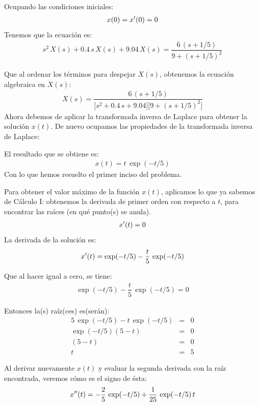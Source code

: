 Ocupando las condiciones iniciales:
\begin{align*}
x(0) = {x}^{\prime}(0) = 0
\end{align*}
Tenemos que la ecuación es:
\begin{align*}
s^{2} \, X(s) + 0.4 \, s \, X(s) + 9.04 \, X(s) = \dfrac{6 \, (s + 1/5)}{9 + (s + 1/5)^{2}}
\end{align*}

Que al ordenar los términos para despejar $X(s)$, obtenemos la ecuación algebraica en $X(s)$:
\begin{align*}
X(s) = \dfrac{6 \, (s + 1/5)}{\big[s^{2} + 0.4 \, s + 9.04\big] \big[9 + (s + 1/5)^{2}\big]}
\end{align*}
Ahora debemos de aplicar la transformada inversa de Laplace para obtener la solución $x(t)$. De nuevo ocupamos las propiedades de la transformada inversa de Laplace:

El resultado que se obtiene es:
\begin{align*}
x(t) = t \, \exp (-t/5)
\end{align*}
Con lo que hemos resuelto el primer inciso del problema.

Para obtener el valor máximo de la función $x(t)$, aplicamos lo que ya sabemos de Cálculo I:  obtenemos la derivada de primer orden con respecto a $t$, para encontrar las raíces (en qué punto(s) se anula).
\begin{align*}
{x}^{\prime}(t) = 0
\end{align*}
La derivada de la solución es:
\begin{align*}
{x}^{\prime}(t) = \exp(-t/5) - \dfrac{t}{5} \, \exp(-t/5) 
\end{align*}

Que al hacer igual a cero, se tiene:
\begin{align*}
\exp(-t/5) - \dfrac{t}{5} \, \exp(-t/5) = 0
\end{align*}

Entonces la(s) raíz(ces) es(serán):
\begin{eqnarray*}
5 \, \exp(-t/5) - t \, \exp(-t/5) &=& 0  \\[0.5em] 
\exp(-t/5) (5 - t) &=& 0 \\[0.5em] 
(5 - t) &=& 0 \\[0.5em] 
t &=& 5
\end{eqnarray*}

Al derivar nuevamente $x(t)$ y evaluar la segunda derivada con la raíz encontrada, veremos cómo es el signo de ésta:
\begin{align*}
{x}^{\prime \prime}(t) = -\dfrac{2}{5} \, \exp(-t/5) + \dfrac{1}{25} \, \exp(-t/5) \, t
\end{align*}

